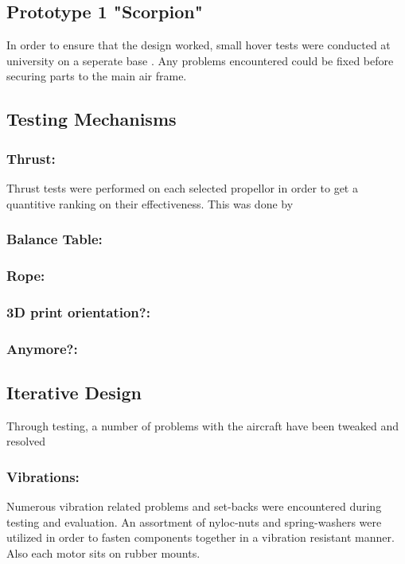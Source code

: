 
\subsection{Prototype 1 "Scorpion"}
In order to ensure that the design worked, small hover tests were conducted at university on a seperate base . Any problems encountered could be fixed before securing parts to the main air frame.

\subsection{Testing Mechanisms}
\subsubsection*{Thrust:} Thrust tests were performed on each selected propellor in order to get a quantitive ranking on their effectiveness. This was done by 
\subsubsection*{Balance Table:}
\subsubsection*{Rope:}
\subsubsection*{3D print orientation?:}
\subsubsection*{Anymore?:}

\subsection{Iterative Design}
Through testing, a number of problems with the aircraft have been tweaked and resolved

\subsubsection*{Vibrations:} Numerous vibration related problems and set-backs were encountered during testing and evaluation. An assortment of nyloc-nuts and spring-washers were utilized in order to fasten components together in a vibration resistant manner. Also each motor sits on rubber mounts.
